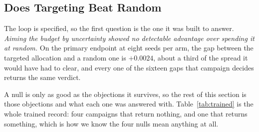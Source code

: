 \documentclass{article}
\newif\ifrevmarked \revmarkedtrue
\DeclareRobustCommand{\revShared}[1]{\ifrevmarked{\color{RevShared}#1}\else{#1}\fi}
\begin{document}
\subsection{Does Targeting Beat Random}
\label{sec:null}
The loop is specified, so the first question is the one it was built to answer. \textit{Aiming the budget by uncertainty \revShared{showed no detectable advantage over} spending it at random.} On the primary endpoint at eight seeds
per arm, the gap between the targeted allocation and a random one is $+0.0024$, about a third of
the spread it would have had to clear, and every one of the sixteen gaps that campaign decides
returns the same verdict.

A null is only as good as the objections it survives, so the rest of this section is those
objections and what each one was answered with. Table~\ref{tab:trained} is the whole trained record: four campaigns that return nothing, and one that returns something, which is how we know the four
nulls mean anything at all.
\end{document}
